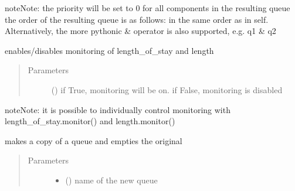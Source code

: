 \documentclass[letterpaper,10pt,english]{sphinxmanual}
\begin{document}
\begin{fulllineitems}
\begin{fulllineitems}
\begin{sphinxadmonition}{note}{Note:}
the priority will be set to 0 for all components in the
resulting  queue 
the order of the resulting queue is as follows: 
in the same order as in self. 
Alternatively, the more pythonic \& operator is also supported, e.g. q1 \& q2
\end{sphinxadmonition}

\end{fulllineitems}


\begin{fulllineitems}
\label{\detokenize{Reference:salabim.Queue.monitor}}
enables/disables monitoring of length\_of\_stay and length
\begin{quote}\begin{description}
\item[{Parameters}] \leavevmode
{} () \textendash{} if True, monitoring will be on. 
if False, monitoring is disabled 

\end{description}\end{quote}

\begin{sphinxadmonition}{note}{Note:}
it is possible to individually control monitoring with length\_of\_stay.monitor() and length.monitor()
\end{sphinxadmonition}

\end{fulllineitems}


\begin{fulllineitems}
\label{\detokenize{Reference:salabim.Queue.move}}
makes a copy of a queue and empties the original
\begin{quote}\begin{description}
\item[{Parameters}] \leavevmode\begin{itemize}
\item {} 
 () \textendash{} name of the new queue


\end{itemize}
\end{description}
\end{quote}
\end{fulllineitems}
\end{fulllineitems}
\end{document}
